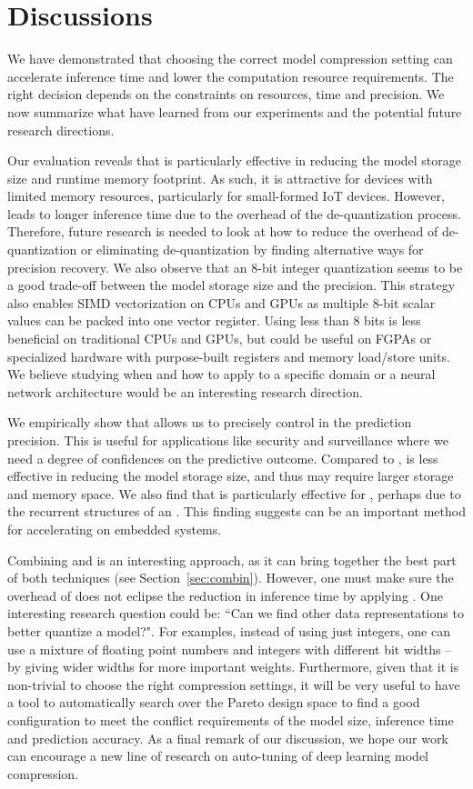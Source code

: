 \section{Discussions}
We have demonstrated that choosing the correct model compression setting can accelerate inference time and lower the computation resource
requirements. The right decision depends on the constraints on resources, time and precision. We now summarize what have learned from our
experiments and the potential future research directions.

Our evaluation reveals that \dquantization is particularly effective in reducing the model storage size and runtime memory footprint. As
such, it is attractive for devices with limited memory resources, particularly for small-formed IoT devices. However, \quantization leads
to longer inference time due to the overhead of the de-quantization process. Therefore, future research is needed to look at how to reduce
the overhead of de-quantization or eliminating de-quantization by finding alternative ways for precision recovery. We also observe that an
8-bit integer quantization seems to be a good trade-off between the model storage size and the precision. This strategy also enables SIMD
vectorization on CPUs and GPUs as multiple 8-bit scalar values can be packed into one vector register. Using less than 8 bits is less
beneficial on traditional CPUs and GPUs, but could be useful on FGPAs or specialized hardware with purpose-built registers and memory
load/store units. We believe studying when and how to apply \dquantization to a specific domain or a neural network architecture would be
an interesting research direction.

We empirically show that \pruning allows us to precisely control in the prediction precision. This is useful for applications like security
and surveillance where we need a degree of confidences on the predictive outcome. Compared to \dquantization, \pruning is less effective in
reducing the model storage size, and thus may require larger storage and memory space. We also find that \pruning is particularly effective
for \RNNs, perhaps due to the recurrent structures of an \RNN. This finding suggests \pruning can be an important method for accelerating
\RNN on embedded systems.

Combining \dquantization and \pruning is an interesting approach, as it can bring together the best part of both techniques (see
Section~\ref{sec:combin}). However, one must  make sure the overhead of \dquantization does not eclipse the reduction in inference time by
applying \pruning. One interesting research question could be: ``Can we find other data representations to better quantize a model?". For
examples, instead of using just integers, one can use a mixture of floating point numbers and integers with different bit widths – by
giving wider widths for more important weights. Furthermore, given that it is non-trivial to choose the right compression settings, it will
be very useful to have a tool to automatically search over the Pareto design space to find a good configuration to meet the conflict
requirements of the model size, inference time and prediction accuracy.  As a final remark of our discussion, we hope our work can
encourage a new line of research on auto-tuning of deep learning model compression.
